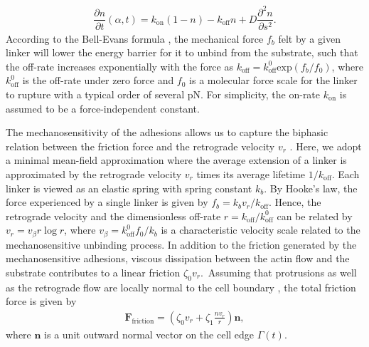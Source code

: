 \documentclass[12pt]{article}
\newcommand{\mbf}{\boldsymbol}
\newcommand{\pdif}[2]{\dfrac{\partial #1}{\partial #2}}
\begin{document}
        \begin{align}
            \pdif{n}{t}(\alpha,t) = k_{\text{on}}(1-n) - k_{\text{off}}n + D\pdif{^2n}{s^2}.     \label{kinetic eq}
        \end{align}
        According to the Bell-Evans formula \cite{bell1978models,evans2007forces}, the mechanical force $f_b$ felt by a given linker will lower the energy barrier for it to unbind from the substrate, such that the off-rate increases exponentially with the force as $k_{\text{off}} = k_{\text{off}}^0 \text{exp}(f_b/f_0)$, where $k_{\text{off}}^0$ is the off-rate under zero force and $f_0$ is a molecular force scale for the linker to rupture with a typical order of several pN. 
        For simplicity, the on-rate $k_{\text{on}}$ is assumed to be a force-independent constant. 

        The mechanosensitivity of the adhesions allows us to capture the biphasic relation between the friction force and the retrograde velocity $v_r$ \cite{filippov2004friction,sabass2010modeling,li2010model,craig2015model}. 
        Here, we adopt a minimal mean-field approximation \cite{sens2020stick} where the average extension of a linker is approximated by the retrograde velocity $v_r$ times its average lifetime $1/k_{\text{off}}$. 
        Each linker is viewed as an elastic spring with spring constant $k_b$. 
        By Hooke's law, the force experienced by a single linker is given by $f_b = k_b v_r/k_{\text{off}}$.
        Hence, the retrograde velocity and the dimensionless off-rate $r = k_{\text{off}} / k_{\text{off}}^0$ can be related by $v_r = v_\beta r\log r$, where $v_\beta = k_{\text{off}}^0 f_0/k_b$ is a characteristic velocity scale related to the mechanosensitive unbinding process. 
        In addition to the friction generated by the mechanosensitive adhesions, viscous dissipation between the actin flow and the substrate contributes to a linear friction $\zeta_0 v_r$.\ 
        Assuming that protrusions as well as the retrograde flow are locally normal to the cell boundary \cite{lee1993principles,nickaeen2017free}, the total friction force is given by
        \begin{align}
            \mbf{F}_{\text{friction}} = \left(\zeta_0 v_r + \zeta_1 \frac{nv_r}{r}\right) \mbf{n}, 
        \end{align}
        where $\mbf{n}$ is a unit outward normal vector on the cell edge $\Gamma(t)$.
\end{document}
